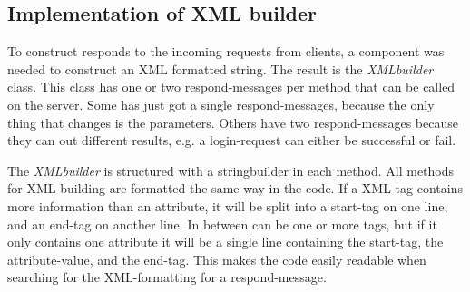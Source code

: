 \subsection{Implementation of XML builder}
\label{sec:xmlbuilderimpl}
To construct responds to the incoming requests from clients, a component was needed to construct an XML formatted string. The result is the \textit{XMLbuilder} class. This class has one or two respond-messages per method that can be called on the server. Some has just got a single respond-messages, because the only thing that changes is the parameters. Others have two respond-messages because they can out different results, e.g. a login-request can either be successful or fail. 

The \textit{XMLbuilder} is structured with a stringbuilder in each method. All methods for XML-building are formatted the same way in the code. If a XML-tag contains more information than an attribute, it will be split into a start-tag on one line, and an end-tag on another line. In between can be one or more tags, but if it only contains one attribute it will be a single line containing the start-tag, the attribute-value, and the end-tag. This makes the code easily readable when searching for the XML-formatting for a respond-message. 